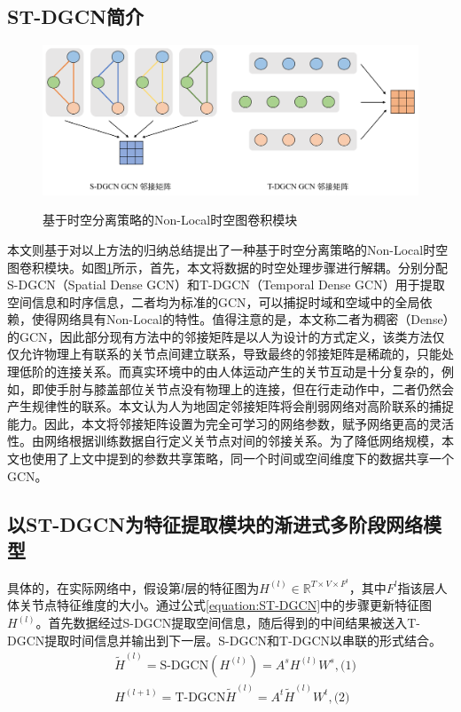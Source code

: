 \subsection{ST-DGCN简介}
\begin{figure}[ht]
    \centering
    \includegraphics[width=1\textwidth]{FigMa/Our_gcn.png}\\
    \vspace{-0.3cm}
    \caption{基于时空分离策略的Non-Local时空图卷积模块}
    \label{fig:Our_gcn_structure}
\end{figure}
本文则基于对以上方法的归纳总结提出了一种基于时空分离策略的Non-Local时空图卷积模块。如图\ref{fig:Our_gcn_structure}所示，首先，本文将数据的时空处理步骤进行解耦。分别分配S-DGCN（Spatial Dense GCN）和T-DGCN（Temporal Dense GCN）用于提取空间信息和时序信息，二者均为标准的GCN，可以捕捉时域和空域中的全局依赖，使得网络具有Non-Local的特性。值得注意的是，本文称二者为稠密（Dense）的GCN，因此部分现有方法\parencite{cui2020learning}中的邻接矩阵是以人为设计的方式定义，该类方法仅仅允许物理上有联系的关节点间建立联系，导致最终的邻接矩阵是稀疏的，只能处理低阶的连接关系。而真实环境中的由人体运动产生的关节互动是十分复杂的，例如，即使手肘与膝盖部位关节点没有物理上的连接，但在行走动作中，二者仍然会产生规律性的联系。本文认为人为地固定邻接矩阵将会削弱网络对高阶联系的捕捉能力。因此，本文将邻接矩阵设置为完全可学习的网络参数，赋予网络更高的灵活性。由网络根据训练数据自行定义关节点对间的邻接关系。为了降低网络规模，本文也使用了上文中提到的参数共享策略，同一个时间或空间维度下的数据共享一个GCN。

\subsection{以ST-DGCN为特征提取模块的渐进式多阶段网络模型}
具体的，在实际网络中，假设第$l$层的特征图为${H}^{(l)}\in \mathbb{R}^{T\times V \times F^l}$，其中$F^l$指该层人体关节点特征维度的大小。通过公式\ref{equation:ST-DGCN}中的步骤更新特征图${H}^{(l)}$。首先数据经过S-DGCN提取空间信息，随后得到的中间结果被送入T-DGCN提取时间信息并输出到下一层。S-DGCN和T-DGCN以串联的形式结合。
\begin{equation}
    \begin{aligned}
        & {\widetilde{H}^{(l)}} = \text{S-DGCN}(H^{(l)}) = A^s H^{(l)} W^s, \text{(1)}
        \\
        & H^{(l+1)} = \text{T-DGCN}{\widetilde{H}^{(l)}} = A^t {\widetilde{H}^{(l)}} W^t, \text{(2)}
    \end{aligned}
    \label{equation:ST-DGCN}
\end{equation}

